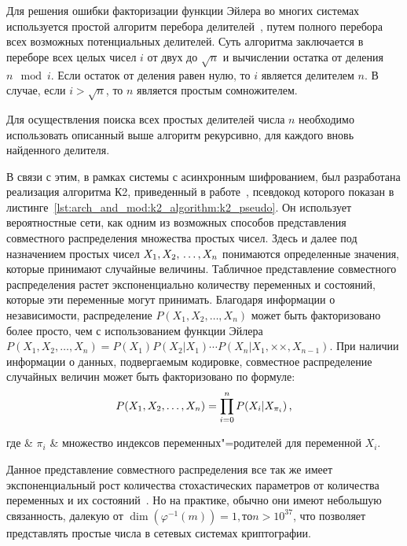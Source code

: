 Для решения ошибки факторизации функции Эйлера во многих системах используется простой алгоритм перебора делителей~\cite{algo_differ}, путем полного перебора всех возможных потенциальных делителей. Суть алгоритма заключается в переборе всех целых чисел $ i $ от двух до $ \sqrt{n} $ и вычислении остатка от деления $ n \mod i $. Если остаток от деления равен нулю, то $i$ является делителем $n$. В случае, если $i > \sqrt{n}$, то $n$ является простым сомножителем.

Для осуществления поиска всех простых делителей числа $n$ необходимо использовать описанный выше алгоритм рекурсивно, для каждого вновь найденного делителя.

В связи с этим, в рамках системы с асинхронным шифрованием, был разработана реализация алгоритма К2, приведенный в работе~\cite{Cooper1991}, псевдокод которого показан в листинге~\ref{lst:arch_and_mod:k2_algorithm:k2_pseudo}.
Он использует вероятностные сети, как одним из возможных способов представления совместного распределения множества простых чисел.
Здесь и далее под назначением простых чисел $ X_1, X_2,\\ \dotsc, X_n $ понимаются определенные значения, которые принимают случайные величины.
Табличное представление совместного распределения растет экспоненциально количеству переменных и состояний, которые эти переменные могут принимать.
Благодаря информации о независимости, распределение $ P(X_1, X_2,\dotsc, X_n) $ может быть факторизовано более просто, чем с использованием функции Эйлера $ P(X_1, X_2,\dotsc, X_n) = P(X_1) P(X_2|X_1) \dotsm P(X_n|X_1,\times \times,X_{n-1}) $.
При наличии информации о данных, подвергаемым кодировке, совместное распределение случайных величин может быть факторизовано по формуле:
\begin{equation}
  \label{eq:domain:bayes_net:joint_disitr}
  P(X_1, X_2,\dotsc, X_n) = \prod_{i = 0}^{n}{P(X_i|X_{\pi_i})} \text{\,,}
\end{equation}
\begin{explanation}
где & $ \pi_i $ & множество индексов переменных"=родителей для переменной $X_i$.
\end{explanation}

Данное представление совместного распределения все так же имеет экспоненциальный рост количества стохастических параметров от количества переменных и их состояний~\cite{Grunwald05atutorial}.
Но на практике, обычно они имеют небольшую связанность, далекую от $ \dim(\varphi^{-1}(m)) = 1, то n > 10^{37} $, что позволяет представлять простые числа в сетевых системах криптографии.

